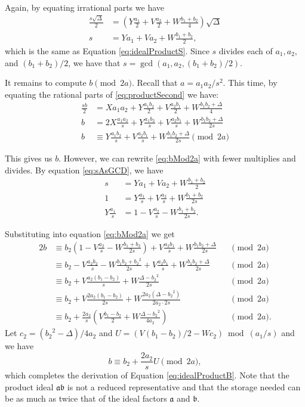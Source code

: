 \documentclass{ucalgthes1}
\theoremstyle{plain}
\theoremstyle{definition}
\begin{document}
\noindent
Again, by equating irrational parts we have
\begin{align}
	\frac{s\sqrt\Delta}{2} & = \left(Y\frac{a_1}{2} + V\frac{a_2}{2} + W\frac{b_1+b_2}{4}\right)\sqrt\Delta \nonumber \\
	s & = Ya_1 + Va_2 + W\frac{b_1+b_2}{2}, \label{eq:sAsGCD}
\end{align}
which is the same as Equation \ref{eq:idealProductS}.  Since $s$ divides each of $a_1, a_2,$ and $(b_1+b_2)/2$, we have that $s = \gcd(a_1, a_2, (b_1+b_2)/2)$.

It remains to compute $b \pmod{2a}$.  Recall that $a = a_1a_2/s^2$.  This time, by equating the rational parts of \eqref{eq:productSecond} we have:
\begin{align}
	\frac{sb}{2} & = Xa_1a_2 + Y\frac{a_1b_2}{2} + V\frac{a_2b_1}{2} + W\frac{b_1b_2 + \Delta}{4} \nonumber \\
	b & = 2X\frac{a_1a_2}{s} + Y\frac{a_1b_2}{s} + V\frac{a_2b_1}{s} + W\frac{b_1b_2 + \Delta}{2s} \nonumber \\
	b & \equiv Y\frac{a_1b_2}{s} + V\frac{a_2b_1}{s} + W\frac{b_1b_2 + \Delta}{2s} \pmod{2a} \label{eq:bMod2a}
\end{align}

\noindent
This gives us $b$.  However, we can rewrite \eqref{eq:bMod2a} with fewer multiplies and divides.  By equation \eqref{eq:sAsGCD}, we have
\begin{align*}
	s & = Ya_1 + Va_2 + W\frac{b_1+b_2}{2} \\
	1 & = Y\frac{a_1}{s} + V\frac{a_2}{s} + W\frac{b_1+b_2}{2s} \\
	Y\frac{a_1}{s} & = 1 - V\frac{a_2}{s} - W\frac{b_1+b_2}{2s}.
\end{align*}

\noindent
Substituting into equation \eqref{eq:bMod2a} we get
\begin{alignat*}{2}
	b & \equiv b_2(1-V\frac{a_2}{s} - W\frac{b_1+b_2}{2s}) + V\frac{a_2b_1}{s} + W\frac{b_1b_2 + \Delta}{2s} && \pmod{2a} \\
	& \equiv b_2 - V\frac{a_2b_2}{s} - W\frac{b_1b_2+{b_2}^2}{2s} + V\frac{a_2b_1}{s} + W\frac{b_1b_2 + \Delta}{2s} && \pmod{2a} \\
	& \equiv b_2 + V\frac{a_2(b_1-b_2)}{s} + W\frac{\Delta - {b_2}^2}{2s} && \pmod{2a} \\
	& \equiv b_2 + V\frac{2a_2(b_1-b_2)}{2s} + W\frac{2a_2(\Delta - {b_2}^2)}{2a_2 \cdot 2s} && \pmod{2a} \\
	& \equiv b_2 + \frac{2a_2}{s} \left( V\frac{b_1-b_2}{2} + W\frac{\Delta - {b_2}^2}{4a_2} \right) && \pmod{2a}.
\end{alignat*}
Let $c_2 = ({b_2}^2 - \Delta)/4a_2$ and $U = (V(b_1-b_2)/2 - Wc_2) \bmod{(a_1/s)}$ and we have
\[
	b \equiv b_2 + \frac{2a_2}{s} U \pmod{2a},
\]
which completes the derivation of Equation \ref{eq:idealProductB}.  Note that the product ideal $\mathfrak a \mathfrak b$ is not a reduced representative and that the storage needed can be as much as twice that of the ideal factors $\mathfrak a$ and $\mathfrak b$.
\end{document}
